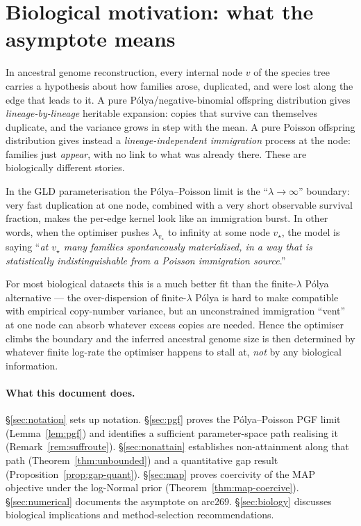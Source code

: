 \documentclass[11pt]{article}
\newcommand{\dup}{\lambda}             %
\theoremstyle{definition}
\begin{document}
\section{Biological motivation: what the asymptote means}
\label{sec:bio-motivation}

In ancestral genome reconstruction, every internal node $v$ of the
species tree carries a hypothesis about how families arose,
duplicated, and were lost along the edge that leads to it. A pure
Pólya/negative-binomial offspring distribution gives \emph{lineage-by-lineage}
heritable expansion: copies that survive can themselves duplicate, and
the variance grows in step with the mean. A pure Poisson offspring
distribution gives instead a \emph{lineage-independent immigration}
process at the node: families just \emph{appear}, with no link to
what was already there. These are biologically different stories.

In the GLD parameterisation the Pólya--Poisson limit is the
``$\dup \to \infty$'' boundary: very fast duplication at one node,
combined with a very short observable survival fraction, makes the
per-edge kernel look like an immigration burst.  In other words, when
the optimiser pushes $\dup_{v_\star}$ to infinity at some node
$v_\star$, the model is saying ``\emph{at $v_\star$ many families
spontaneously materialised, in a way that is statistically
indistinguishable from a Poisson immigration source}.''

For most biological datasets this is a much better fit than the
finite-$\dup$ Pólya alternative --- the over-dispersion of
finite-$\dup$ Pólya is hard to make compatible with empirical
copy-number variance, but an unconstrained immigration ``vent'' at
one node can absorb whatever excess copies are needed.  Hence the
optimiser climbs the boundary and the inferred ancestral genome
size is then determined by whatever finite log-rate the optimiser
happens to stall at, \emph{not} by any biological information.

\paragraph{What this document does.}
\S\ref{sec:notation} sets up notation. \S\ref{sec:pgf} proves the
Pólya--Poisson PGF limit (Lemma~\ref{lem:pgf}) and identifies
a sufficient parameter-space path realising it
(Remark~\ref{rem:suffroute}).  \S\ref{sec:nonattain} establishes
non-attainment along that path (Theorem~\ref{thm:unbounded}) and a
quantitative gap result (Proposition~\ref{prop:gap-quant}).
\S\ref{sec:map} proves coercivity of the MAP objective under the
log-Normal prior (Theorem~\ref{thm:map-coercive}).
\S\ref{sec:numerical} documents the asymptote on arc269.
\S\ref{sec:biology} discusses biological implications and
method-selection recommendations.
\end{document}
